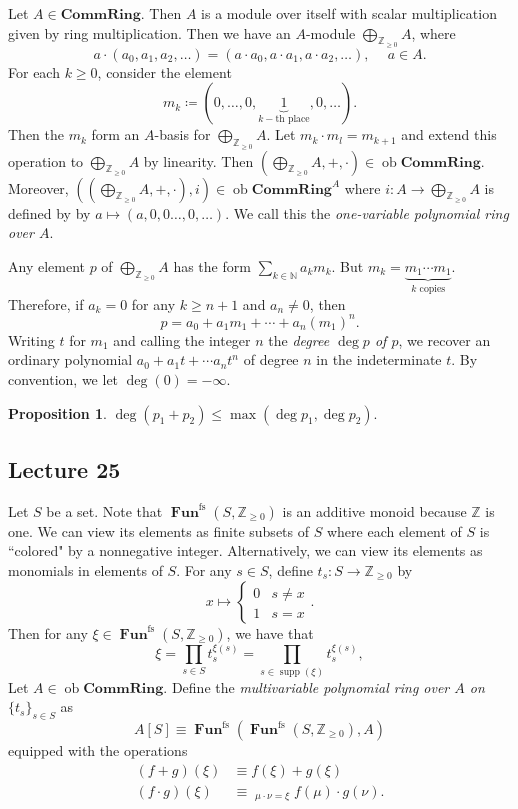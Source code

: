 \documentclass[10pt,letterpaper,cm]{nupset}
\theoremstyle{definition}
\theoremstyle{theorem}
\newtheorem{prop}[definition]{Proposition}
\theoremstyle{remark}
\newcommand{\N}{\mathbb N}
\newcommand{\Z}{\mathbb Z}
\newcommand{\1}{\mathbf{1}}
\newcommand{\0}{\vec 0}
\DeclareMathOperator{\ob}{ob}
\DeclareMathOperator{\fs}{fs}
\DeclareMathOperator{\Fun}{\mathbf{Fun}}
\DeclareMathOperator{\supp}{supp}
\begin{document}
Let $A \in \mathbf{CommRing}$. Then $A$ is a module over itself with scalar multiplication given by ring multiplication. Then we have an $A$-module $\bigoplus_{\Z_{\geq 0}} A$, where 
\[
a\cdot \left(a_0, a_1, a_2, \ldots \right) = \left(a\cdot a_0, a\cdot a_1, a\cdot a_2, \ldots \right), \ \quad a \in A.
\] For each $k\geq 0$, consider the element $$m_k \coloneqq \left(0, \ldots, 0, \underbrace{1}_{k-\text{th place}}, 0 , \ldots \right).$$ Then the $m_k$ form an $A$-basis for  $\bigoplus_{\Z_{\geq 0}} A$. Let $m_k \cdot m_l = m_{k+1}$ and extend this operation to $\bigoplus_{\Z_{\geq 0}} A$ by linearity. Then $\left(\bigoplus_{\Z_{\geq 0}} A, + , \cdot\right) \in  \ob{\mathbf{CommRing}}$. Moreover, $\left(\left(\bigoplus_{\Z_{\geq 0}} A, + , \cdot\right), i\right) \in  \ob{\mathbf{CommRing}^A}$ where $i : A \to \bigoplus_{\Z_{\geq 0}}A$ is defined by by $a \mapsto \left(a, 0, 0 \ldots, 0, \ldots\right)$. We call this the \textit{one-variable polynomial ring over $A$}.


Any element $p$ of $\bigoplus_{\Z_{\geq 0}} A$ has the form $\sum_{k\in \N}a_km_k$. But $m_k = \underbrace{m_1\cdots m_1}_{k \text{ copies}}$. Therefore, if $a_k =0$ for any $k\geq n+1$ and $a_n \ne 0$, then   $$p = a_0 + a_1m_1 + \cdots + a_n(m_1)^n.$$ Writing $t$ for $m_1$ and calling the integer $n$ the \textit{degree $\deg{p}$ of $p$}, we recover an ordinary polynomial $a_0 + a_1t + \cdots a_nt^n$ of degree $n$ in the indeterminate $t$. By convention, we let $\deg(0)= {-\infty}$.


\begin{prop}
$\deg(p_1 + p_2) \leq \max(\deg p_1, \deg p_2)$.
\end{prop}

\subsection{Lecture 25}


Let $S$ be a set. Note that $\Fun^{\fs}(S, \Z_{\geq 0})$ is an additive monoid because $\Z$ is one. We can view its elements as finite subsets of $S$ where each element of $S$ is ``colored" by a nonnegative integer. Alternatively, we can view its elements as monomials in elements of $S$. For any $s\in S$, define $t_s : S \to \Z_{\geq 0}$ by $$x \mapsto \begin{cases} 0 & s \ne x \\ 1 & s =x \end{cases}.$$ Then for any $\xi \in \Fun^{\fs}(S, \Z_{\geq 0})$, we have that $$\xi = \prod_{s\in S}t_s^{\xi(s)} =\prod_{s\in \supp(\xi)}t_s^{\xi(s)},$$
Let $A \in \ob \mathbf{CommRing}$. Define the \textit{multivariable polynomial ring over $A$ on $\{t_s\}_{s\in S}$} as $$A[S] \equiv \Fun^{\fs}(\Fun^{\fs}(S, \Z_{\geq 0}), A)$$ equipped with the operations
\begin{align*}
(f+g)(\xi) & \equiv f(\xi) +g(\xi)
\\ (f\cdot g)(\xi) & \equiv \mathop{\sum_{\mu, \nu}}_{\mu \cdot \nu = \xi} f(\mu) \cdot g(\nu).
\end{align*}
\end{document}
